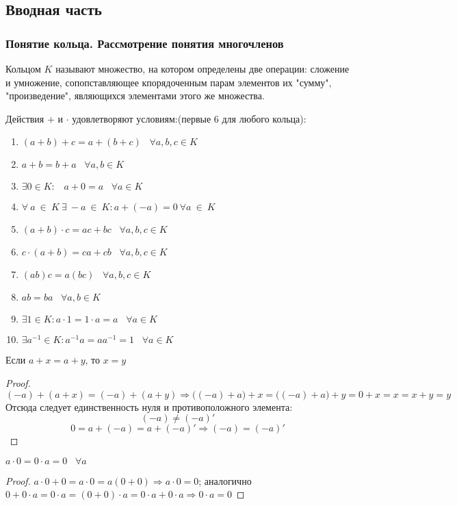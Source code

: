 \subsection{Вводная часть}
\subsubsection{Понятие кольца. Рассмотрение понятия многочленов}
\begin{definition}
Кольцом $K$ называют множество, на котором определены две операции: сложение и умножение, сопопставляющее кпорядоченным парам элементов их "сумму", "произведение", являющихся элементами этого же множества.
\end{definition}
Действия $+$ и $\cdot$ удовлетворяют условиям:(первые $6$ для любого кольца):
\begin{enumerate}
    \item $(a+b)+c=a+(b+c)\;\;\;\forall a,b,c \in K$
    \item $a+b=b+a\;\;\;\forall a,b\in K$
    \item $\exists 0\in K:\;\;\; a+0=a \;\;\;\forall a\in K$
    \item $\forall ~ a ~ \in ~ K ~ \exists ~ -a ~ \in ~ K: a+(-a)=0 ~ \forall a ~\in ~ K$
    \item $(a+b) \cdot c = ac + bc \;\;\; \forall a,b,c \in K$
    \item $c\cdot(a+b)=ca+cb\;\;\; \forall a,b,c\in K$
    \item $(ab)c=a(bc)\;\;\; \forall a,b,c\in K$
    \item $ab=ba \;\;\;\forall a,b\in K$
    \item $\exists 1\in K: a\cdot 1 =1\cdot a = a\;\;\;\forall a\in K$
    \item $\exists a^{-1} \in K: a^{-1}a=aa^{-1}=1\;\;\;\forall a\in K$
\end{enumerate}
\begin{proposition}
Если $a+x=a+y$, то $x=y$
\end{proposition}
\begin{proof}
$$(-a)+(a+x)=(-a)+(a+y)\Rightarrow \big((-a)+a\big) +x= \big((-a)+a\big) +y=0+x=x=x+y=y$$
Отсюда следует единственность нуля и противоположного элемента:
$$(-a)\neq (-a)'$$$$0=a+(-a)=a+(-a)'\Rightarrow(-a)=(-a)'$$
\end{proof}
\begin{proposition}
$a\cdot 0=0\cdot a=0 \;\;\;\forall a$
\end{proposition}
\begin{proof}
$a \cdot 0+0=a \cdot 0 = a(0+0) \Rightarrow a \cdot 0 =0$; аналогично $0+0 \cdot a=0 \cdot a=(0+0) \cdot a =0 \cdot a +0 \cdot a \Rightarrow 0 \cdot a =0$
\end{proof}
